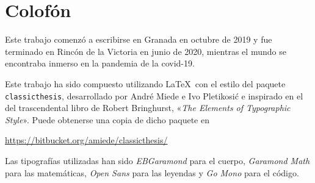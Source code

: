 \pagestyle{empty}

\hfill

\vfill


\section*{Colofón}
Este trabajo comenzó a escribirse en Granada en octubre de 2019 y fue terminado en Rincón de la Victoria en junio de 2020, mientras el mundo se encontraba inmerso en la pandemia de la covid-19.

Este trabajo ha sido compuesto utilizando \LaTeX\ con el estilo del paquete \texttt{classicthesis}, desarrollado por André Miede e Ivo Pletikosić e inspirado en el del trascendental libro de Robert Bringhurst, «\emph{The Elements of Typographic Style}».
Puede obtenerse una copia de dicho paquete en
\begin{center}
\url{https://bitbucket.org/amiede/classicthesis/}
\end{center}
Las tipografías utilizadas han sido \emph{EBGaramond} para el cuerpo, \emph{Garamond Math} para las matemáticas, \emph{Open Sans} para las leyendas y \emph{Go Mono} para el código.
\bigskip